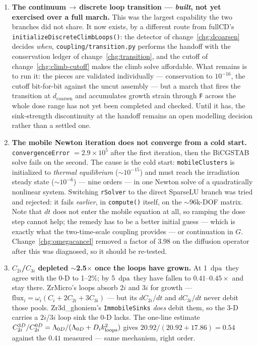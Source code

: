 \documentclass[11pt,a4paper]{article}
\newcommand{\code}[1]{\texttt{\small #1}}
\newcommand{\dpa}{\ensuremath{\mathrm{dpa}}}
\newcounter{chg}
\begin{document}
\begin{enumerate}\itemsep4pt

\item \textbf{The continuum\,$\rightarrow$\,discrete loop transition ---
\emph{built}, not yet exercised over a full march.} This was the largest
capability the two branches did not share. It now exists, by a different route
from fullCD's \code{initializeDiscreteClimbLoops()}: the detector of
change~\ref{chg:dcoarsen} decides \emph{when}, \code{coupling/transition.py}
performs the handoff with the conservation ledger of
change~\ref{chg:transition}, and the cutoff of change~\ref{chg:climb-cutoff}
makes the climb solve affordable. What remains is to run it: the pieces are
validated individually --- conservation to $10^{-16}$, the cutoff bit-for-bit
against the uncut assembly --- but a march that fires the transition at
$d_{\text{coarsen}}$ and accumulates growth strain through \code{F} across the
whole dose range has not yet been completed and checked. Until it has, the
sink-strength discontinuity at the handoff remains an open modelling decision
rather than a settled one.

\item \textbf{The mobile Newton iteration does not converge from a cold start.}
\code{convergenceError} $= 2.9\times10^{5}$ after the first iteration, then the
BiCGSTAB solve fails on the second. The cause is the cold start:
\code{mobileClusters} is initialized to \emph{thermal equilibrium}
($\sim10^{-15}$) and must reach the irradiation steady state ($\sim10^{-6}$) ---
nine orders --- in one Newton solve of a quadratically nonlinear system.
Switching \code{rSolver} to the direct SparseLU branch was tried and rejected:
it fails \emph{earlier}, in \code{compute()} itself, on the $\sim$96k-DOF
matrix. Note that $dt$ does not enter the mobile equation at all, so ramping
the dose step cannot help; the remedy has to be a better initial guess --- which
is exactly what the two-time-scale coupling provides --- or continuation in
$G$. Change~\ref{chg:omegacancel} removed a factor of 3.98 on the diffusion
operator after this was diagnosed, so it should be re-tested.

\item \textbf{$C_{2i}$/$C_{3i}$ depleted $\sim$2.5$\times$ once the loops have
grown.} At 1~\dpa\ they agree with the 0-D to 1--2\%; by 5~\dpa\ they have
fallen to $0.41$--$0.45\times$ and stay there. ZrMicro's loops absorb $2i$ and
$3i$ for growth --- $\text{flux}_i = \omega_i(C_i + 2C_{2i} + 3C_{3i})$ --- but
its $dC_{2i}/dt$ and $dC_{3i}/dt$ never debit those pools. Zr3d\_ghoniem's
\code{ImmobileSinks} \emph{does} debit them, so the 3-D carries a $2i$/$3i$ loop
sink the 0-D lacks. The one-line estimate
$C_{2i}^{3D}/C_{2i}^{0D} = \Lambda_{0D}/(\Lambda_{0D}+D_ik^2_{\rm loops})$
gives $20.92/(20.92+17.86) = 0.54$ against the $0.41$ measured --- same
mechanism, right order.


\end{enumerate}
\end{document}
